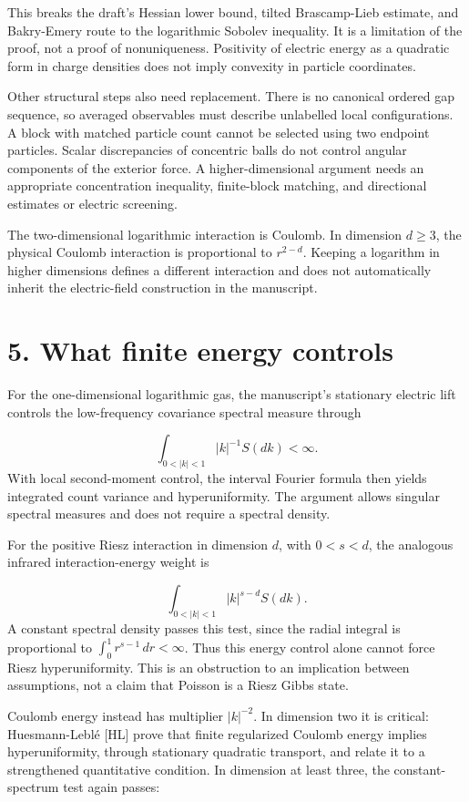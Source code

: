 \documentclass[11pt]{article}
\begin{document}
This breaks the draft's Hessian lower bound, tilted Brascamp-Lieb estimate, and Bakry-Emery route to the logarithmic Sobolev inequality. It is a limitation of the proof, not a proof of nonuniqueness. Positivity of electric energy as a quadratic form in charge densities does not imply convexity in particle coordinates.

Other structural steps also need replacement. There is no canonical ordered gap sequence, so averaged observables must describe unlabelled local configurations. A block with matched particle count cannot be selected using two endpoint particles. Scalar discrepancies of concentric balls do not control angular components of the exterior force. A higher-dimensional argument needs an appropriate concentration inequality, finite-block matching, and directional estimates or electric screening.

The two-dimensional logarithmic interaction is Coulomb. In dimension $d\geq3$, the physical Coulomb interaction is proportional to $r^{2-d}$. Keeping a logarithm in higher dimensions defines a different interaction and does not automatically inherit the electric-field construction in the manuscript.

\section*{5. What finite energy controls}
For the one-dimensional logarithmic gas, the manuscript's stationary electric lift controls the low-frequency covariance spectral measure through

\[
\int_{0<|k|<1}|k|^{-1}S(dk)<\infty.
\]
With local second-moment control, the interval Fourier formula then yields integrated count variance and hyperuniformity. The argument allows singular spectral measures and does not require a spectral density.

For the positive Riesz interaction in dimension $d$, with $0<s<d$, the analogous infrared interaction-energy weight is

\[
\int_{0<|k|<1}|k|^{s-d}S(dk).
\]
A constant spectral density passes this test, since the radial integral is proportional to $\int_0^1r^{s-1}\,dr<\infty$. Thus this energy control alone cannot force Riesz hyperuniformity. This is an obstruction to an implication between assumptions, not a claim that Poisson is a Riesz Gibbs state.

Coulomb energy instead has multiplier $|k|^{-2}$. In dimension two it is critical: Huesmann-Leblé [HL] prove that finite regularized Coulomb energy implies hyperuniformity, through stationary quadratic transport, and relate it to a strengthened quantitative condition. In dimension at least three, the constant-spectrum test again passes:
\end{document}
